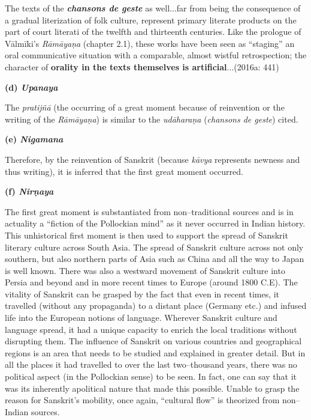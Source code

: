 \begin{myquote}
The texts of the \textit{\textbf{chansons de geste}} as well...far from being the consequence of a gradual literization of folk culture, represent primary literate products on the part of court literati of the twelfth and thirteenth centuries. Like the prologue of Vālmīki’s \textit{Rāmāyaṇa} (chapter 2.1), these works have been seen as “staging” an oral communicative situation with a comparable, almost wistful retrospection; the character of \textbf{orality in the texts themselves is artiﬁcial}...(2016a: 441)
\end{myquote}

\newpage

\textbf{(d) \textit{Upanaya}}

The \textit{pratijñā} (the occurring of a great moment because of reinvention or the writing of the \textit{Rāmāyaṇa}) is similar to the \textit{udāharaṇa} (\textit{chansons de geste}) cited.

\textbf{(e) \textit{Nigamana}}

Therefore, by the reinvention of Sanskrit (because \textit{kāvya} represents newness and thus writing), it is inferred that the first great moment occurred.

\textbf{(f) \textit{Nirṇaya}}

The first great moment is substantiated from non–traditional sources and is in actuality a “fiction of the Pollockian mind” as it never occurred in Indian history. This unhistorical first moment is then used to support the spread of Sanskrit literary culture across South Asia. The spread of Sanskrit culture across not only southern, but also northern parts of Asia such as China and all the way to Japan is well known. There was also a westward movement of Sanskrit culture into Persia and beyond and in more recent times to Europe (around 1800 C.E). The vitality of Sanskrit can be grasped by the fact that even in recent times, it travelled (without any propaganda) to a distant place (Germany etc.) and infused life into the European notions of language. Wherever Sanskrit culture and language spread, it had a unique capacity to enrich the local traditions without disrupting them. The influence of Sanskrit on various countries and geographical regions is an area that needs to be studied and explained in greater detail. But in all the places it had travelled to over the last two–thousand years, there was no political aspect (in the Pollockian sense) to be seen. In fact, one can say that it was its inherently apolitical nature that made this possible. Unable to grasp the reason for Sanskrit’s mobility, once again, “cultural flow” is theorized from non–Indian sources.


